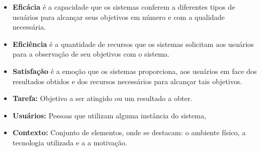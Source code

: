 \begin{itemize}
\item \textbf{Eficácia} é a capacidade que os sistemas conferem a diferentes tipos de usuários para alcançar seus objetivos em número e com a qualidade necessária. 

\item \textbf{Eficiência} é a quantidade de recursos que os sistemas solicitam aos usuários para a observação de seu objetivos com o sistema.

\item \textbf{Satisfação} é a emoção que os sistemas proporciona, aos usuários em face dos resultados obtidos e dos recursos necessários para alcançar tais objetivos. 

\item \textbf{Tarefa:} Objetivo a ser atingido ou um resultado a obter.

\item \textbf{Usuários:} Pessoas que utilizam alguma instância do sistema,

\item \textbf{Contexto:} Conjunto de elementos, onde se destacam: o ambiente físico, a tecnologia utilizada e a a motivação.
\end{itemize}

